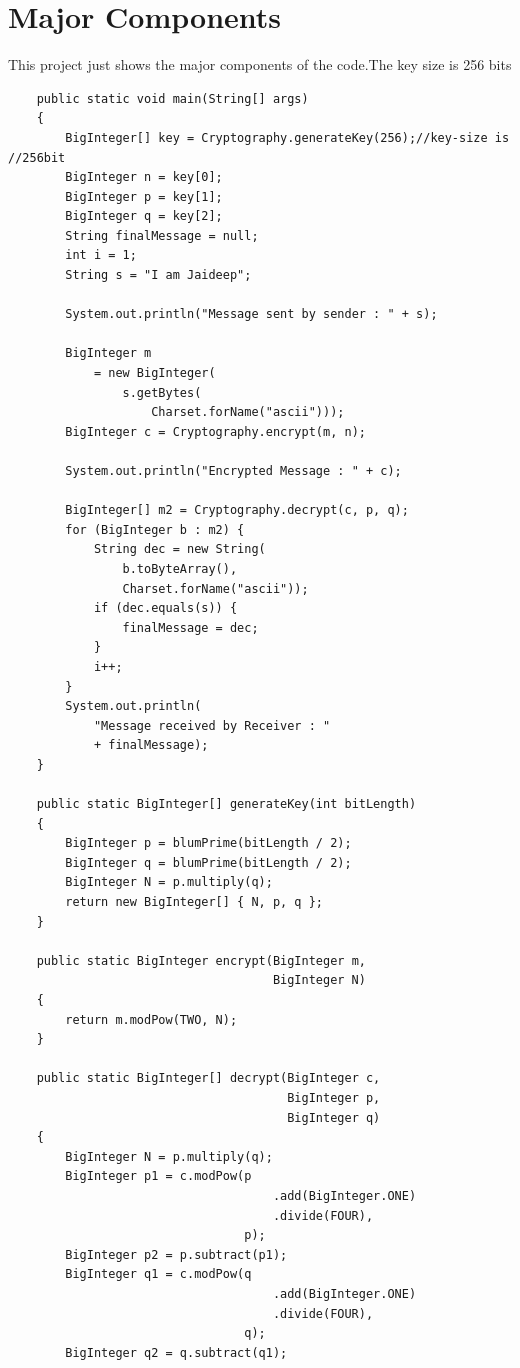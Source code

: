 \documentclass[12pt,a4paper]{article}
\begin{document}
\section{Major Components}
This project just shows the major components of the code.The key size is 256 bits
\begin{verbatim}
    public static void main(String[] args) 
    { 
        BigInteger[] key = Cryptography.generateKey(256);//key-size is //256bit 
        BigInteger n = key[0]; 
        BigInteger p = key[1]; 
        BigInteger q = key[2]; 
        String finalMessage = null; 
        int i = 1; 
        String s = "I am Jaideep"; 
  
        System.out.println("Message sent by sender : " + s); 
  
        BigInteger m 
            = new BigInteger( 
                s.getBytes( 
                    Charset.forName("ascii"))); 
        BigInteger c = Cryptography.encrypt(m, n); 
  
        System.out.println("Encrypted Message : " + c); 
  
        BigInteger[] m2 = Cryptography.decrypt(c, p, q); 
        for (BigInteger b : m2) { 
            String dec = new String( 
                b.toByteArray(), 
                Charset.forName("ascii")); 
            if (dec.equals(s)) { 
                finalMessage = dec; 
            } 
            i++; 
        } 
        System.out.println( 
            "Message received by Receiver : "
            + finalMessage); 
    } 
    
    public static BigInteger[] generateKey(int bitLength) 
    { 
        BigInteger p = blumPrime(bitLength / 2); 
        BigInteger q = blumPrime(bitLength / 2); 
        BigInteger N = p.multiply(q); 
        return new BigInteger[] { N, p, q }; 
    } 
  
    public static BigInteger encrypt(BigInteger m, 
                                     BigInteger N) 
    { 
        return m.modPow(TWO, N); 
    } 
  
    public static BigInteger[] decrypt(BigInteger c, 
                                       BigInteger p, 
                                       BigInteger q) 
    { 
        BigInteger N = p.multiply(q); 
        BigInteger p1 = c.modPow(p 
                                     .add(BigInteger.ONE) 
                                     .divide(FOUR), 
                                 p); 
        BigInteger p2 = p.subtract(p1); 
        BigInteger q1 = c.modPow(q 
                                     .add(BigInteger.ONE) 
                                     .divide(FOUR), 
                                 q); 
        BigInteger q2 = q.subtract(q1); 
  

\end{verbatim}
\end{document}
